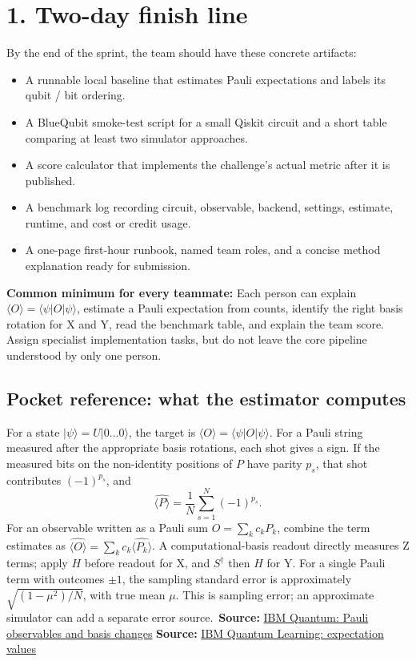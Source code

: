 \documentclass[11pt,letterpaper]{article}
\newcommand{\source}[2]{\textbf{Source:} \href{#1}{#2}}
\begin{document}
\section*{1. Two-day finish line}
By the end of the sprint, the team should have these concrete artifacts:
\begin{itemize}
  \item A runnable local baseline that estimates Pauli expectations and labels its qubit / bit ordering.
  \item A BlueQubit smoke-test script for a small Qiskit circuit and a short table comparing at least two simulator approaches.
  \item A score calculator that implements the challenge's actual metric after it is published.
  \item A benchmark log recording circuit, observable, backend, settings, estimate, runtime, and cost or credit usage.
  \item A one-page first-hour runbook, named team roles, and a concise method explanation ready for submission.
\end{itemize}

\textbf{Common minimum for every teammate:} Each person can explain \(\langle O\rangle=\langle\psi|O|\psi\rangle\), estimate a Pauli expectation from counts, identify the right basis rotation for X and Y, read the benchmark table, and explain the team score. Assign specialist implementation tasks, but do not leave the core pipeline understood by only one person.

\subsection*{Pocket reference: what the estimator computes}
For a state \(|\psi\rangle=U|0\ldots0\rangle\), the target is \(\langle O\rangle=\langle\psi|O|\psi\rangle\). For a Pauli string measured after the appropriate basis rotations, each shot gives a sign. If the measured bits on the non-identity positions of \(P\) have parity \(p_s\), that shot contributes \((-1)^{p_s}\), and
\[
  \widehat{\langle P\rangle}=\frac{1}{N}\sum_{s=1}^{N}(-1)^{p_s}.
\]
For an observable written as a Pauli sum \(O=\sum_k c_kP_k\), combine the term estimates as \(\widehat{\langle O\rangle}=\sum_k c_k\widehat{\langle P_k\rangle}\). A computational-basis readout directly measures Z terms; apply \(H\) before readout for X, and \(S^\dagger\) then \(H\) for Y. For a single Pauli term with outcomes \(\pm1\), the sampling standard error is approximately \(\sqrt{(1-\mu^2)/N}\), with true mean \(\mu\). This is sampling error; an approximate simulator can add a separate error source.\
\source{https://quantum.cloud.ibm.com/docs/en/guides/specify-observables-pauli}{IBM Quantum: Pauli observables and basis changes} \quad
\source{https://learning.quantum.ibm.com/course/variational-algorithm-design/cost-functions}{IBM Quantum Learning: expectation values}
\end{document}
